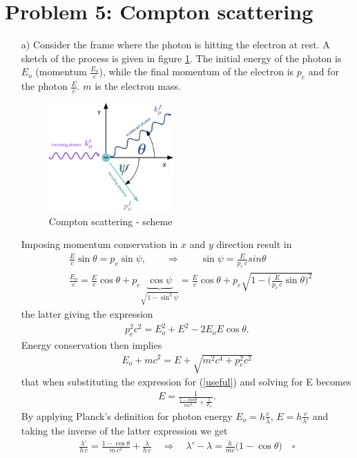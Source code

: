 \documentclass[10pt,a4paper]{article}
\begin{document}
\section*{Problem 5: Compton scattering}
\begin{enumerate}
\item[a)] Consider the frame where the photon is hitting the electron at rest. A sketch of the process is given in figure \ref{fig:compton}. The initial energy of the photon is $E_o$ (momentum $\frac{E_o}{c}$), while the final momentum of the electron is $p_e$ and for the photon $\frac{E}{c}$. $m$ is the electron mass.

\begin{figure}[!ht]
\centering
\includegraphics[width=0.45\textwidth]{Compton.png}
\caption{Compton scattering - scheme}
\label{fig:compton}
\end{figure}

Imposing momentum conservation in $x$ and $y$ direction result in
\begin{align*}
&\frac{E}{c}\sin\theta = p_e\sin\psi,\qquad\Rightarrow\qquad\sin\psi=\frac{E}{p_e\,c}sin\theta\\
&\frac{E_o}{c} = \frac{E}{c}\cos\theta + p_e\underbrace{\cos\psi}_{\sqrt{1-\sin^2\psi}} = \frac{E}{c}\cos\theta + p_e\sqrt{1-\bigg( \frac{E}{p_e\,c}\sin\theta \bigg)^2}
\end{align*}
the latter giving the expression
\begin{align}
\label{useful}
p_e^2c^2 = E_o^2+E^2-2E_oE\cos\theta.
\end{align}
Energy conservation then implies
\begin{align*}
E_o + mc^2 = E+\sqrt{m^2c^4+p_e^2c^2}
\end{align*}
that when substituting the expression for (\ref{useful}) and solving for E becomes
\begin{align}
\label{eq:comptonenergy}
E = \frac{1}{\frac{1-cos\theta}{mc^2}+\frac{1}{E_o}}.
\end{align}
By applying Planck's definition for photon energy $E_o=h\frac{c}{\lambda},\,E=h\frac{c}{\lambda'}$ and taking the inverse of the latter expression we get
\begin{align*}
\frac{\lambda'}{h\,c} = \frac{1-\cos\theta}{m\,c^2}+\frac{\lambda}{h\,c}\quad\Rightarrow\quad \lambda' - \lambda = \frac{h}{mc}\big( 1-\cos\theta \big)\quad\square
\end{align*}


\end{enumerate}
\end{document}
